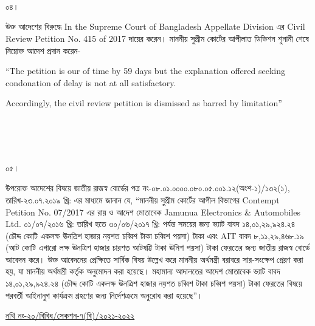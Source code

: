 \documentclass[12pt]{article}
\begin{document}
\\
\\
\\
\begin{minipage}[t]{0.05\linewidth}
০৪।
\end{minipage}
\begin{minipage}[t]{1\linewidth}
উক্ত আদেশের বিরুদ্ধে
In the Supreme Court of Bangladesh
Appellate Division
এর
Civil Review Petition
No. 415 of 2017
দায়ের করেন। মাননীয় সুপ্রীম কোর্টের
আপীলাত ডিভিশন শুনানী শেষে নিম্নোক্ত
আদেশ প্রদান করেন-

\hspace{1em}``The petition is our of time
by 59 days but the explanation
offered seeking condonation of
delay is not at all satisfactory.


\hspace{1em} Accordingly, the civil review petition
is dismissed as barred by limitation''
\end{minipage}
\\
\\
\\
\begin{minipage}[t]{0.05\linewidth}
০৫।
\end{minipage}
\begin{minipage}[t]{1\linewidth}
উপরোক্ত আদেশের বিষয়ে
জাতীয় রাজস্ব বোর্ডের পত্র
নং-০৮.০১.০০০০.০৮০.০৫.০০১.১২(অংশ-১)/১৩২(১),
তারিখ-২৩.০৭.২০১৯ খ্রি: এর মাধ্যমে জানান যে,
``মাননীয় সুপ্রীম কোর্টের আপীল বিভাগের
Contempt Petition No. 07/2017
এর রায় ও আদেশ মোতাবেক
Jamunua Electronics \& Automobiles Ltd.
০১/০৭/২০১৬ খ্রি: তারিখ হতে ৩০/০৬/২০১৭ খ্রি:
পর্যন্ত সময়ের জন্য ভ্যাট বাবদ
১৪,০১,২৯,৯২৪.২৪
(চৌদ্দ কোটি একলক্ষ ঊনত্রিশ হাজার নয়শত চব্বিশ টাকা চব্বিশ পয়সা) টাকা
এবং AIT বাবদ
৮,১১,২৯,৪৬৮.১৯
(আট কোটি এগারো লক্ষ ঊনত্রিশ হাজার চারশত আটষট্টি টাকা ঊনিশ পয়সা) টাকা
ফেরতের জন্য জাতীয় রাজস্ব বোর্ডে আবেদন করে। উক্ত আবেদনের
প্রেক্ষিতে সার্বিক বিষয় উল্লেখ করে মাননীয় অর্থমন্ত্রী বরাবরে
সার-সংক্ষেপ প্রেরণ করা হয়, যা মাননীয় অর্থমন্ত্রী কর্তৃক অনুমোদন
করা হয়েছে। মহামান্য আদালতের আদেশ মোতাবেক ভ্যাট বাবদ
১৪,০১,২৯,৯২৪.২৪
(চৌদ্দ কোটি একলক্ষ ঊনত্রিশ হাজার নয়শত চব্বিশ টাকা চব্বিশ পয়সা) টাকা
ফেরতের বিষয়ে পরবর্তী আইনানুগ কার্যক্রম গ্রহণের জন্য
নির্দেশক্রমে অনুরোধ করা হয়েছে''।
\end{minipage}
\newpage
\begin{minipage}[t]{0.59\linewidth}
\hspace{0.5em}
\end{minipage}
\begin{minipage}[t]{1\textwidth}
\underline{নথি নং-২০/বিবিধ/সেকশন-৭(বি)/২০২১-২০২২}
\end{minipage}
\end{document}
